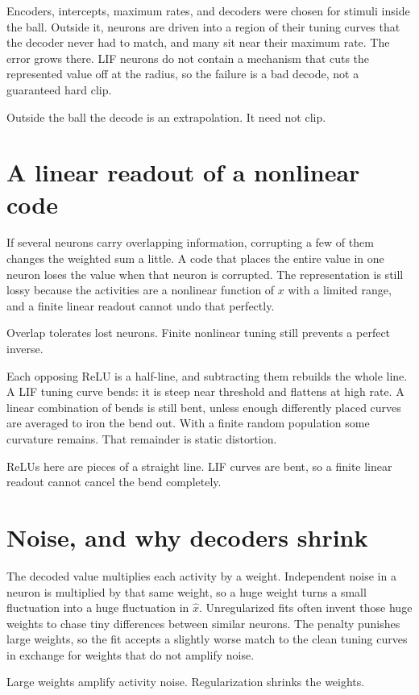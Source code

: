 \documentclass[11pt,letterpaper]{article}
\newcommand{\ans}[1]{\par\vspace{2pt}{\bfseries #1}\quad}
\begin{document}
\ans{2.}
Encoders, intercepts, maximum rates, and decoders were chosen for stimuli inside the ball. Outside it, neurons are driven into a region of their tuning curves that the decoder never had to match, and many sit near their maximum rate. The error grows there. LIF neurons do not contain a mechanism that cuts the represented value off at the radius, so the failure is a bad decode, not a guaranteed hard clip.
\begin{result}
Outside the ball the decode is an extrapolation. It need not clip.
\end{result}

\section{A linear readout of a nonlinear code}

\ans{1.}
If several neurons carry overlapping information, corrupting a few of them changes the weighted sum a little. A code that places the entire value in one neuron loses the value when that neuron is corrupted. The representation is still lossy because the activities are a nonlinear function of \(x\) with a limited range, and a finite linear readout cannot undo that perfectly.
\begin{result}
Overlap tolerates lost neurons. Finite nonlinear tuning still prevents a perfect inverse.
\end{result}

\ans{2.}
Each opposing ReLU is a half-line, and subtracting them rebuilds the whole line. A LIF tuning curve bends: it is steep near threshold and flattens at high rate. A linear combination of bends is still bent, unless enough differently placed curves are averaged to iron the bend out. With a finite random population some curvature remains. That remainder is static distortion.
\begin{result}
ReLUs here are pieces of a straight line. LIF curves are bent, so a finite linear readout cannot cancel the bend completely.
\end{result}

\section{Noise, and why decoders shrink}

\ans{1.}
The decoded value multiplies each activity by a weight. Independent noise in a neuron is multiplied by that same weight, so a huge weight turns a small fluctuation into a huge fluctuation in \(\hat{x}\). Unregularized fits often invent those huge weights to chase tiny differences between similar neurons. The penalty punishes large weights, so the fit accepts a slightly worse match to the clean tuning curves in exchange for weights that do not amplify noise.
\begin{result}
Large weights amplify activity noise. Regularization shrinks the weights.
\end{result}
\end{document}
